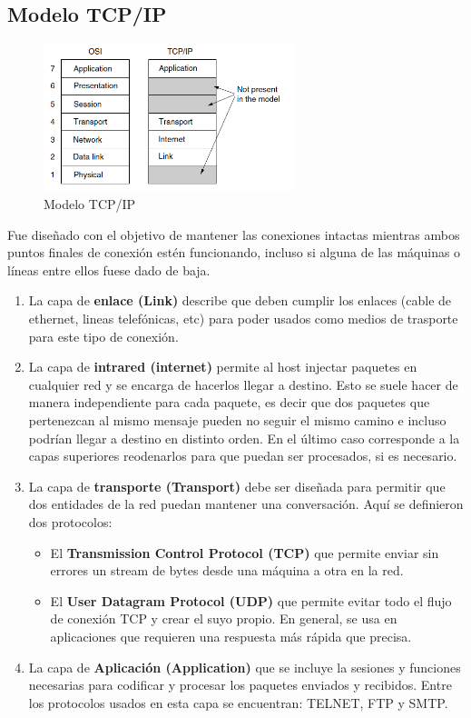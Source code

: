 \subsection{Modelo TCP/IP}
\begin{figure}[H]
	\centering
	\includegraphics[width=0.65\textwidth
]{images/tcpip.png}
	\caption[Modelo TCP/IP de Referencia]{Modelo TCP/IP}
	\label{fig:tcp}
\end{figure}

Fue diseñado con el objetivo de mantener las conexiones intactas mientras ambos puntos finales de conexión estén funcionando, incluso si alguna de las máquinas o líneas entre ellos fuese dado de baja.

\begin{enumerate}
  \item La capa de \textbf{enlace (Link)} describe que deben cumplir los enlaces (cable de ethernet, lineas telefónicas, etc) para poder usados como medios de trasporte para este tipo de conexión.
  \item La capa de \textbf{intrared (internet)} permite al host injectar paquetes en cualquier red y se encarga de hacerlos llegar a destino. Esto se suele hacer de manera independiente para cada paquete, es decir que dos paquetes que pertenezcan al mismo mensaje pueden no seguir el mismo camino e incluso podrían llegar a destino en distinto orden. En el último caso corresponde a la capas superiores reodenarlos para que puedan ser procesados, si es necesario.
  \item La capa de \textbf{transporte (Transport)} debe ser diseñada para permitir que dos entidades de la red puedan mantener una conversación. Aquí se definieron dos protocolos:
  \begin{itemize}
    \item El \textbf{Transmission Control Protocol (TCP)} que permite enviar sin errores un stream de bytes desde una máquina a otra en la red.
    \item El \textbf{User Datagram Protocol (UDP)} que permite evitar todo el flujo de conexión TCP y crear el suyo propio. En general, se usa en aplicaciones que requieren una respuesta más rápida que precisa. 
  \end{itemize}
  \item La capa de \textbf{Aplicación (Application)} que se incluye la sesiones y funciones necesarias para codificar y procesar los paquetes enviados y recibidos. Entre los protocolos usados en esta capa se encuentran: TELNET, FTP y SMTP.
\end{enumerate}
